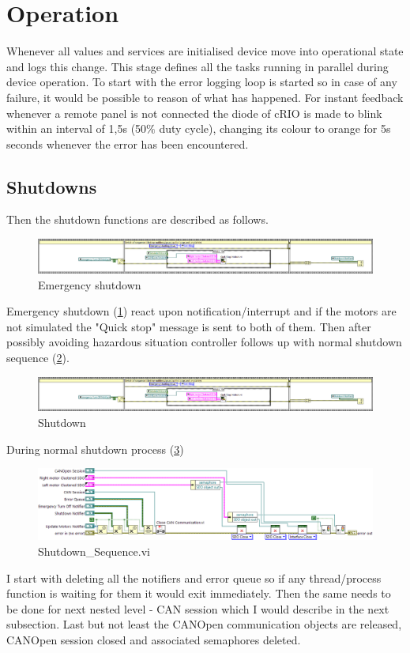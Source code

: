\section{Operation}
Whenever all values and services are initialised device move into operational state and logs this change.
This stage defines all the tasks running in parallel during device operation. To start with the error logging loop is started so in case of any failure, it would be possible to reason of what has happened. 
For instant feedback whenever a remote panel is not connected the diode of cRIO is made to blink within an interval of 1,5s (50$\%$ duty cycle), changing its colour to orange for 5s seconds whenever the error has been encountered.\label{cRIO_LED}

\subsection{Shutdowns}
Then the shutdown functions are described as follows.
\begin{figure}[h]
    \centering
    \includegraphics[scale=\visc,max width=\textwidth]{figures/Emergency_turn_off}
    \caption{Emergency shutdown}
    \label{vi:emc_shut}
\end{figure}
Emergency shutdown (\ref{vi:emc_shut}) react upon notification/interrupt and if the motors are not simulated the "Quick stop" message is sent to both of them. Then after possibly avoiding hazardous situation controller follows up with normal shutdown sequence (\ref{vi:shut}).
\begin{figure}[h]
    \centering
    \includegraphics[scale=\visc,max width=\textwidth]{figures/Emergency_turn_off}
    \caption{Shutdown}
    \label{vi:shut}
\end{figure}

During normal shutdown process (\ref{vi:shut_seq})
\begin{figure}[h]
    \centering
    \includegraphics[scale=\visc,max width=\textwidth]{figures/Shutdown_Sequenced}
    \caption{Shutdown\_Sequence.vi}
    \label{vi:shut_seq}
\end{figure}
I start with deleting all the notifiers and error queue so if any thread/process function is waiting for them it would exit immediately.
Then the same needs to be done for next nested level - CAN session which I would describe in the next subsection.
Last but not least the CANOpen communication objects are released, CANOpen session closed and associated semaphores deleted. 


